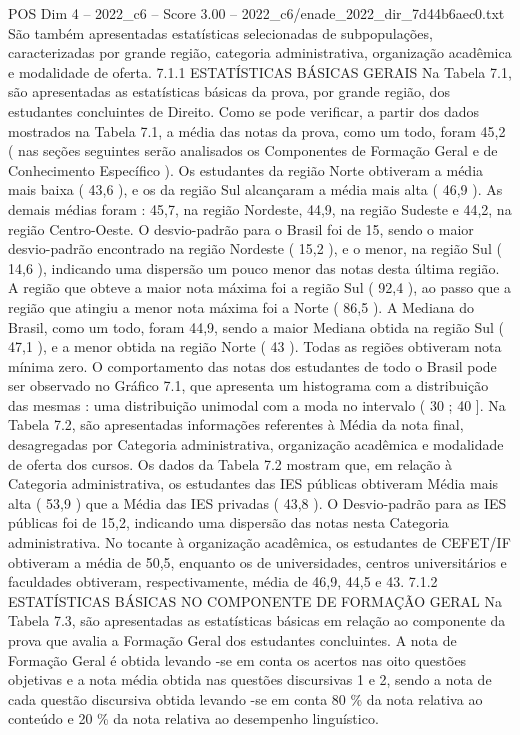 \begin{textsample}{POS Dim 4 – 2022\_c6 – Score 3.00 – 2022\_c6/enade\_2022\_dir\_7d44b6aec0.txt}
São também apresentadas estatísticas selecionadas de subpopulações, caracterizadas por grande região, categoria administrativa, organização acadêmica e modalidade de oferta. 7.1.1 ESTATÍSTICAS BÁSICAS GERAIS Na Tabela 7.1, são apresentadas as estatísticas básicas da prova, por grande região, dos estudantes concluintes de Direito.
Como se pode verificar, a partir dos dados mostrados na Tabela 7.1, a média das notas da prova, como um todo, foram 45,2 ( nas seções seguintes serão analisados os Componentes de Formação Geral e de Conhecimento Específico ).
Os estudantes da região Norte obtiveram a média mais baixa ( 43,6 ), e os da região Sul alcançaram a média mais alta ( 46,9 ).
As demais médias foram : 45,7, na região Nordeste, 44,9, na região Sudeste e 44,2, na região Centro-Oeste.
O desvio-padrão para o Brasil foi de 15, sendo o maior desvio-padrão encontrado na região Nordeste ( 15,2 ), e o menor, na região Sul ( 14,6 ), indicando uma dispersão um pouco menor das notas desta última região.
A região que obteve a maior nota máxima foi a região Sul ( 92,4 ), ao passo que a região que atingiu a menor nota máxima foi a Norte ( 86,5 ).
A Mediana do Brasil, como um todo, foram 44,9, sendo a maior Mediana obtida na região Sul ( 47,1 ), e a menor obtida na região Norte ( 43 ).
Todas as regiões obtiveram nota mínima zero.
O comportamento das notas dos estudantes de todo o Brasil pode ser observado no Gráfico 7.1, que apresenta um histograma com a distribuição das mesmas : uma distribuição unimodal com a moda no intervalo ( 30 ; 40 ].
Na Tabela 7.2, são apresentadas informações referentes à Média da nota final, desagregadas por Categoria administrativa, organização acadêmica e modalidade de oferta dos cursos.
Os dados da Tabela 7.2 mostram que, em relação à Categoria administrativa, os estudantes das IES públicas obtiveram Média mais alta ( 53,9 ) que a Média das IES privadas ( 43,8 ).
O Desvio-padrão para as IES públicas foi de 15,2, indicando uma dispersão das notas nesta Categoria administrativa.
No tocante à organização acadêmica, os estudantes de CEFET/IF obtiveram a média de 50,5, enquanto os de universidades, centros universitários e faculdades obtiveram, respectivamente, média de 46,9, 44,5 e 43. 7.1.2 ESTATÍSTICAS BÁSICAS NO COMPONENTE DE FORMAÇÃO GERAL Na Tabela 7.3, são apresentadas as estatísticas básicas em relação ao componente da prova que avalia a Formação Geral dos estudantes concluintes.
A nota de Formação Geral é obtida levando -se em conta os acertos nas oito questões objetivas e a nota média obtida nas questões discursivas 1 e 2, sendo a nota de cada questão discursiva obtida levando -se em conta 80 \% da nota relativa ao conteúdo e 20 \% da nota relativa ao desempenho linguístico.

\end{textsample}
